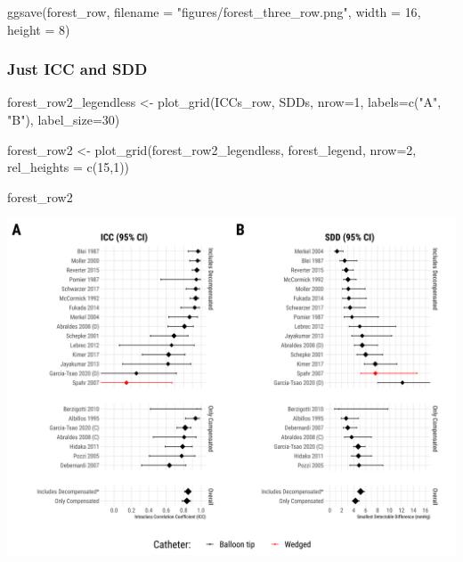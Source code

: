 \documentclass[
]{article}
\newenvironment{Shaded}{\begin{snugshade}}{\end{snugshade}}
\newcommand{\AttributeTok}[1]{\textcolor[rgb]{0.77,0.63,0.00}{#1}}
\newcommand{\DecValTok}[1]{\textcolor[rgb]{0.00,0.00,0.81}{#1}}
\newcommand{\FunctionTok}[1]{\textcolor[rgb]{0.00,0.00,0.00}{#1}}
\newcommand{\NormalTok}[1]{#1}
\newcommand{\OtherTok}[1]{\textcolor[rgb]{0.56,0.35,0.01}{#1}}
\newcommand{\StringTok}[1]{\textcolor[rgb]{0.31,0.60,0.02}{#1}}
\begin{document}
\begin{Shaded}
\begin{Highlighting}[]
\FunctionTok{ggsave}\NormalTok{(forest\_row, }\AttributeTok{filename =} \StringTok{"figures/forest\_three\_row.png"}\NormalTok{, }\AttributeTok{width =} \DecValTok{16}\NormalTok{, }\AttributeTok{height =} \DecValTok{8}\NormalTok{)}
\end{Highlighting}
\end{Shaded}

\hypertarget{just-icc-and-sdd}{%
\subsubsection{Just ICC and SDD}\label{just-icc-and-sdd}}

\begin{Shaded}
\begin{Highlighting}[]
\NormalTok{forest\_row2\_legendless }\OtherTok{\textless{}{-}} \FunctionTok{plot\_grid}\NormalTok{(ICCs\_row, SDDs,}
          \AttributeTok{nrow=}\DecValTok{1}\NormalTok{, }\AttributeTok{labels=}\FunctionTok{c}\NormalTok{(}\StringTok{"A"}\NormalTok{, }\StringTok{"B"}\NormalTok{), }
          \AttributeTok{label\_size=}\DecValTok{30}\NormalTok{)}

\NormalTok{forest\_row2 }\OtherTok{\textless{}{-}} \FunctionTok{plot\_grid}\NormalTok{(forest\_row2\_legendless, forest\_legend,}
                        \AttributeTok{nrow=}\DecValTok{2}\NormalTok{, }\AttributeTok{rel\_heights =} \FunctionTok{c}\NormalTok{(}\DecValTok{15}\NormalTok{,}\DecValTok{1}\NormalTok{))}

\NormalTok{forest\_row2}
\end{Highlighting}
\end{Shaded}

\includegraphics{figures/two_forest_row-1.png}
\end{document}
